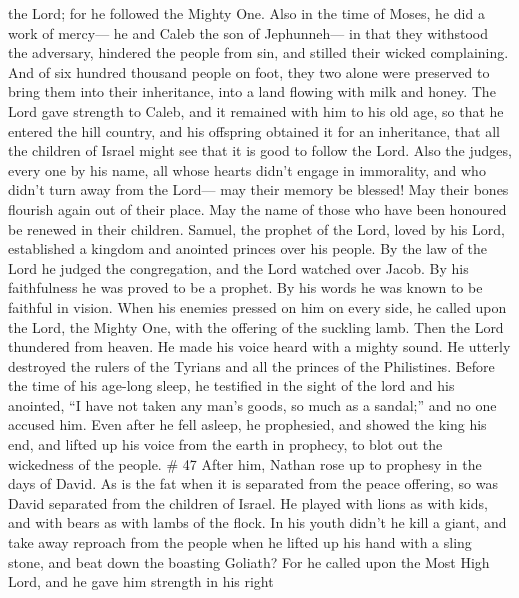 the Lord; for he followed the Mighty One.  Also in the time
of Moses, he did a work of mercy--- he and Caleb the son of Jephunneh---
in that they withstood the adversary, hindered the people from sin, and
stilled their wicked complaining.  And of six hundred
thousand people on foot, they two alone were preserved to bring them
into their inheritance, into a land flowing with milk and honey.
 The Lord gave strength to Caleb, and it remained with him
to his old age, so that he entered the hill country, and his offspring
obtained it for an inheritance,  that all the children of
Israel might see that it is good to follow the Lord.  Also
the judges, every one by his name, all whose hearts didn't engage in
immorality, and who didn't turn away from the Lord--- may their memory
be blessed!  May their bones flourish again out of their
place. May the name of those who have been honoured be renewed in their
children.  Samuel, the prophet of the Lord, loved by his
Lord, established a kingdom and anointed princes over his people.
 By the law of the Lord he judged the congregation, and the
Lord watched over Jacob.  By his faithfulness he was proved
to be a prophet. By his words he was known to be faithful in vision.
 When his enemies pressed on him on every side, he called
upon the Lord, the Mighty One, with the offering of the suckling lamb.
 Then the Lord thundered from heaven. He made his voice
heard with a mighty sound.  He utterly destroyed the rulers
of the Tyrians and all the princes of the Philistines. 
Before the time of his age-long sleep, he testified in the sight of the
lord and his anointed, ``I have not taken any man's goods, so much as a
sandal;'' and no one accused him.  Even after he fell
asleep, he prophesied, and showed the king his end, and lifted up his
voice from the earth in prophecy, to blot out the wickedness of the
people. \# 47  After him, Nathan rose up to prophesy in the
days of David.  As is the fat when it is separated from the
peace offering, so was David separated from the children of Israel.
 He played with lions as with kids, and with bears as with
lambs of the flock.  In his youth didn't he kill a giant,
and take away reproach from the people when he lifted up his hand with a
sling stone, and beat down the boasting Goliath?  For he
called upon the Most High Lord, and he gave him strength in his right
